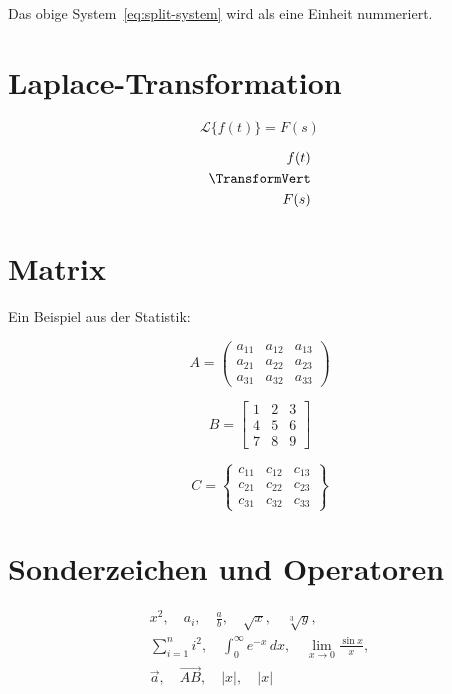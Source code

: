 \documentclass[twoside]{scrreprt}
\begin{document}
\noindent Das obige System~\eqref{eq:split-system} wird als eine Einheit nummeriert.

\section{Laplace-Transformation}
\[
\mathcal{L}\{f(t)\} = F(s)
\]

\[
\begin{aligned}
f(t)\\
\TransformVert\\
F(s)
\end{aligned}
\]

\section{Matrix}
\noindent Ein Beispiel aus der Statistik:

\[
A = \begin{pmatrix}
  a_{11} & a_{12} & a_{13} \\
  a_{21} & a_{22} & a_{23} \\
  a_{31} & a_{32} & a_{33}
\end{pmatrix}
\]

\[
B = \begin{bmatrix}
  1 & 2 & 3 \\
  4 & 5 & 6 \\
  7 & 8 & 9
\end{bmatrix}
\]

\[
C = \left\{
\begin{matrix}
c_{11} & c_{12} & c_{13} \\
c_{21} & c_{22} & c_{23} \\
c_{31} & c_{32} & c_{33}
\end{matrix}
\right\}
\]

\section{Sonderzeichen und Operatoren}

\[
\begin{aligned}
x^2, \quad a_i, \quad \frac{a}{b}, \quad \sqrt{x}, \quad \sqrt[3]{y}, \\ %
\sum_{i=1}^n i^2, \quad \int_0^\infty e^{-x}\,dx, \quad %
\lim_{x\to0} \frac{\sin x}{x}, \\ %
\vec{a}, \quad \overrightarrow{AB}, \quad |x|, \quad \lvert x \rvert %
\end{aligned}
\]
\end{document}
